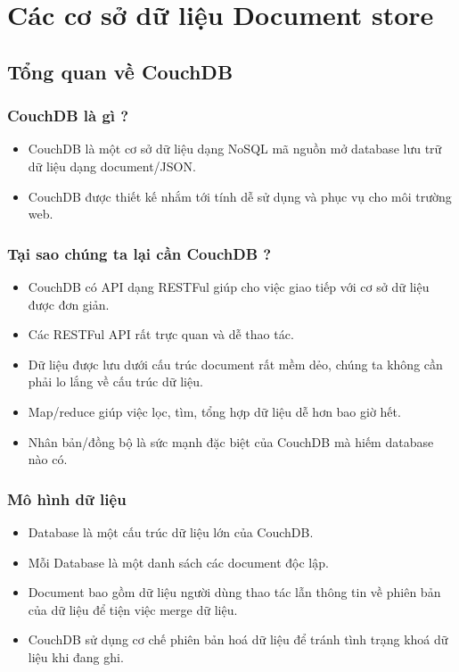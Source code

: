 \chapter{Các cơ sở dữ liệu Document store}

\section{Tổng quan về CouchDB}
	\subsection{CouchDB là gì ?}
		\begin{itemize}
	 		\item CouchDB là một cơ sở dữ liệu dạng NoSQL mã nguồn mở database lưu trữ dữ liệu dạng document/JSON.
	 		\item CouchDB được thiết kế nhắm tới tính dễ sử dụng và phục vụ cho môi trường web.
		\end{itemize}
	\subsection{Tại sao chúng ta lại cần CouchDB ?}
		\begin{itemize}
			\item CouchDB có API dạng RESTFul giúp cho việc giao tiếp với cơ sở dữ liệu được đơn giản.
			\item Các RESTFul API rất trực quan và dễ thao tác.
			\item Dữ liệu được lưu dưới cấu trúc document rất mềm dẻo, chúng ta không cần phải lo lắng về cấu trúc dữ liệu.
			\item Map/reduce giúp việc lọc, tìm, tổng hợp dữ liệu dễ hơn bao giờ hết.
			\item Nhân bản/đồng bộ là sức mạnh đặc biệt của CouchDB mà hiếm database nào có.
		\end{itemize}
	\subsection{Mô hình dữ liệu}
		\begin{itemize}
			\item Database là một cấu trúc dữ liệu lớn của CouchDB.
			\item Mỗi Database là một danh sách các document độc lập.
			\item Document bao gồm dữ liệu người dùng thao tác lẫn thông tin về phiên bản của dữ liệu để tiện việc merge dữ liệu.
			\item CouchDB sử dụng cơ chế phiên bản hoá dữ liệu để tránh tình trạng khoá dữ liệu khi đang ghi.
		\end{itemize}
